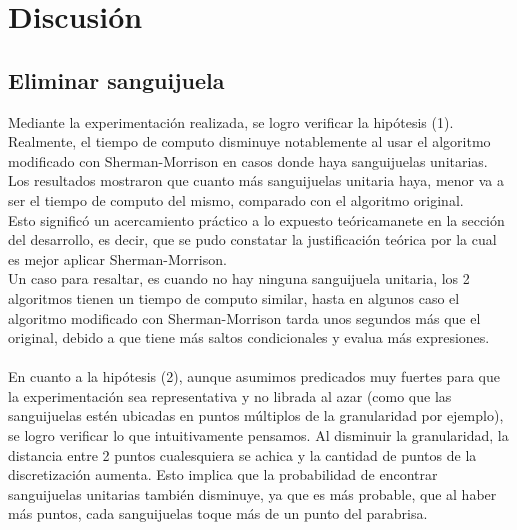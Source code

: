 \section{Discusión}


\subsection{Eliminar sanguijuela}
Mediante la experimentación realizada, se logro verificar la hipótesis (1). Realmente, el tiempo de computo disminuye notablemente al usar el algoritmo modificado con Sherman-Morrison en casos donde haya sanguijuelas unitarias. Los resultados mostraron que cuanto más sanguijuelas unitaria haya, menor va a ser el tiempo de computo del mismo, comparado con el algoritmo original.\\
Esto significó un acercamiento práctico a lo expuesto teóricamanete en la sección del desarrollo, es decir, que se pudo constatar la justificación teórica por la cual es mejor aplicar Sherman-Morrison.\\
Un caso para resaltar, es cuando no hay ninguna sanguijuela unitaria, los 2 algoritmos tienen un tiempo de computo similar, hasta en algunos caso el algoritmo modificado con Sherman-Morrison tarda unos segundos más que el original, debido a que tiene más saltos condicionales y evalua más expresiones.\\
\\
En cuanto a la hipótesis (2), aunque asumimos predicados muy fuertes para que la experimentación sea representativa y no librada al azar (como que las sanguijuelas estén ubicadas en puntos múltiplos de la granularidad por ejemplo), se logro verificar lo que intuitivamente pensamos. Al disminuir la granularidad, la distancia entre 2 puntos cualesquiera se achica y la cantidad de puntos de la discretización aumenta. Esto implica que la probabilidad de encontrar sanguijuelas unitarias también disminuye, ya que es más probable, que al haber más puntos, cada sanguijuelas toque más de un punto del parabrisa.